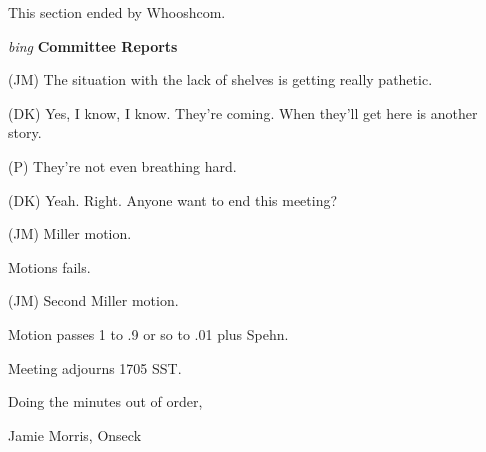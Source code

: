 This section ended by Whooshcom.

\vspace{0.15in}
{\em bing\/} {\bf Committee Reports\/}

(JM) The situation with the lack of shelves is getting really pathetic.

(DK) Yes, I know, I know.  They're coming.  When they'll get here is
another story.

(P) They're not even breathing hard.

(DK) Yeah.  Right.  Anyone want to end this meeting?

(JM) Miller motion.

Motions fails.

(JM) Second Miller motion.

Motion passes 1 to .9 or so to .01 plus Spehn.

Meeting adjourns 1705 SST.

\vspace{0.15in}
\begin{center}
Doing the minutes out of order,

Jamie Morris, Onseck
\end{center}

